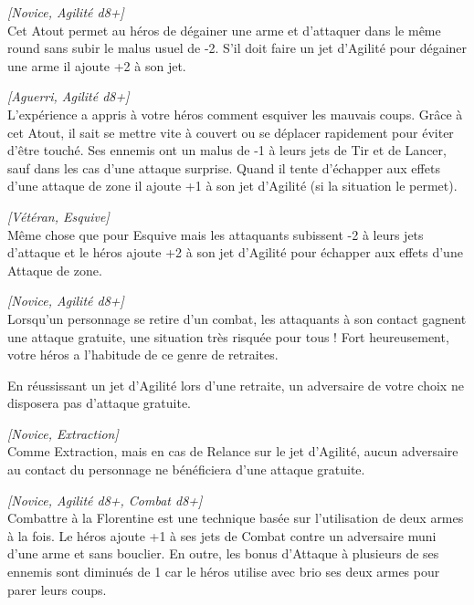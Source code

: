 \begin{description}[align=left]
    \item [Dégaine comme l’éclair]
    	\emph{[Novice, Agilité d8+]}\\
        Cet Atout permet au héros de dégainer une arme et d’attaquer dans le même round sans subir le malus usuel de -2. S’il doit faire un jet d’Agilité pour dégainer une arme il ajoute +2 à son jet.

    \item [Esquive]
    	\emph{[Aguerri, Agilité d8+]}\\
        L’expérience a appris à votre héros comment esquiver les mauvais coups. Grâce à cet Atout, il sait se mettre vite à couvert ou se déplacer rapidement pour éviter d’être touché. Ses ennemis ont un malus de -1 à leurs jets de Tir et de Lancer, sauf dans les cas d’une attaque surprise. Quand il tente d’échapper aux effets d’une attaque de zone il ajoute +1 à son jet d’Agilité (si la situation le permet).

    \item [Grande esquive]
    	\emph{[Vétéran, Esquive]}\\
        Même chose que pour Esquive mais les attaquants subissent -2 à leurs jets d’attaque et le héros ajoute +2 à son jet d’Agilité pour échapper aux effets d’une Attaque de zone.

    \item [Extraction]
    	\emph{[Novice, Agilité d8+]}\\
        Lorsqu’un personnage se retire d’un combat, les attaquants à son contact gagnent une attaque gratuite, une situation très risquée pour tous ! Fort heureusement, votre héros a l’habitude de ce genre de retraites.

		En réussissant un jet d’Agilité lors d’une retraite, un adversaire de votre choix ne disposera pas d’attaque gratuite.

    \item [Grande extraction]
    	\emph{[Novice, Extraction]}\\
        Comme Extraction, mais en cas de Relance sur le jet d’Agilité, aucun adversaire au contact du personnage ne bénéficiera d’une attaque gratuite.

    \item [Florentine]
    	\emph{[Novice, Agilité d8+, Combat d8+]}\\
        Combattre à la Florentine est une technique basée sur l’utilisation de deux armes à la fois. Le héros ajoute +1 à ses jets de Combat contre un adversaire muni d’une arme et sans bouclier. En outre, les bonus d’Attaque à plusieurs de ses ennemis sont diminués de 1 car le héros utilise avec brio ses deux armes pour parer leurs coups.


\end{description}
